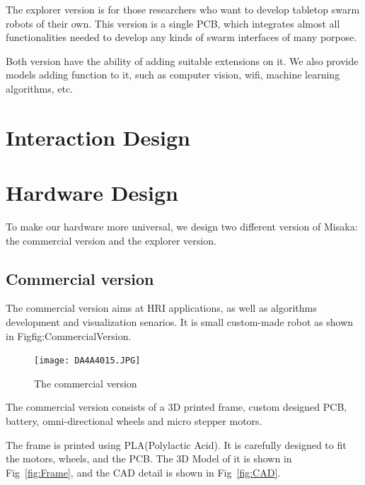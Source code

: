 \documentclass[sigconf]{acmart}
\begin{document}
The explorer version is for those researchers who want to develop tabletop swarm robots of their own. This version is a single PCB, which integrates almost all functionalities needed to develop any kinds of swarm interfaces of many porpose.

Both version have the ability of adding suitable extensions on it. We also provide models adding function to it, such as computer vision, wifi, machine learning algorithms, etc.

\section{Interaction Design}



\section{Hardware Design}

To make our hardware more universal, we design two different version of Misaka: the commercial version and the explorer version.

\subsection{Commercial version}

The commercial version aims at HRI applications, as well as algorithms development and visualization senarios. It is small custom-made robot as shown in Fig{fig:CommercialVersion}.

\begin{figure}[h]
  \centering
  \texttt{[image: DA4A4015.JPG]}
  \caption{The commercial version}
  \label{fig:CommercialVersion}
\end{figure}

The commercial version consists of a 3D printed frame, custom designed PCB, battery, omni-directional wheels and micro stepper motors.

The frame is printed using PLA(Polylactic Acid). It is carefully designed to fit the motors, wheels, and the PCB. The 3D Model of it is shown in Fig~\ref{fig:Frame}, and the CAD detail is shown in Fig~\ref{fig:CAD}.
\end{document}
